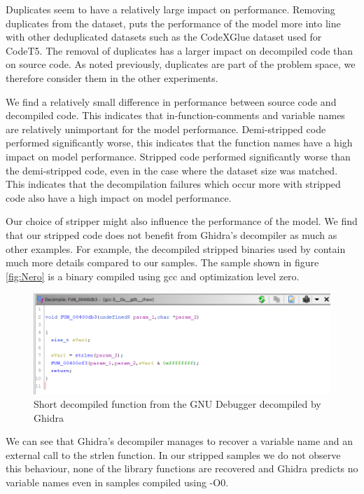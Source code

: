 Duplicates seem to have a relatively large impact on performance. Removing duplicates from the dataset, puts the performance of the model more into line with other deduplicated datasets such as the CodeXGlue dataset used for CodeT5. The removal of duplicates has a larger impact on decompiled code than on source code. As noted previously, duplicates are part of the problem space, we therefore consider them in the other experiments.

We find a relatively small difference in performance between source code and decompiled code. This indicates that in-function-comments and variable names are relatively unimportant for the model performance. Demi-stripped code performed significantly worse, this indicates that the function names have a high impact on model performance. Stripped code performed significantly worse than the demi-stripped code, even in the case where the dataset size was matched. This indicates that the decompilation failures which occur more with stripped code also have a high impact on model performance.

Our choice of stripper might also influence the performance of the model. We find that our stripped code does not benefit from Ghidra's decompiler as much as other examples. For example, the decompiled stripped binaries used by \citeauthor{Nero} contain much more details compared to our samples. The sample shown in figure \ref{fig:Nero} is a binary compiled using gcc and optimization level zero.

\label{fig:Nero}
\begin{figure}[H]
  \centering
  \includegraphics[width=\linewidth]{img/Nero.png}
  \caption{Short decompiled function from the GNU Debugger \cite{Nero} decompiled by Ghidra}
\end{figure}

We can see that Ghidra's decompiler manages to recover a variable name and an external call to the strlen function. In our stripped samples we do not observe this behaviour, none of the library functions are recovered and Ghidra predicts no variable names even in samples compiled using -O0.

